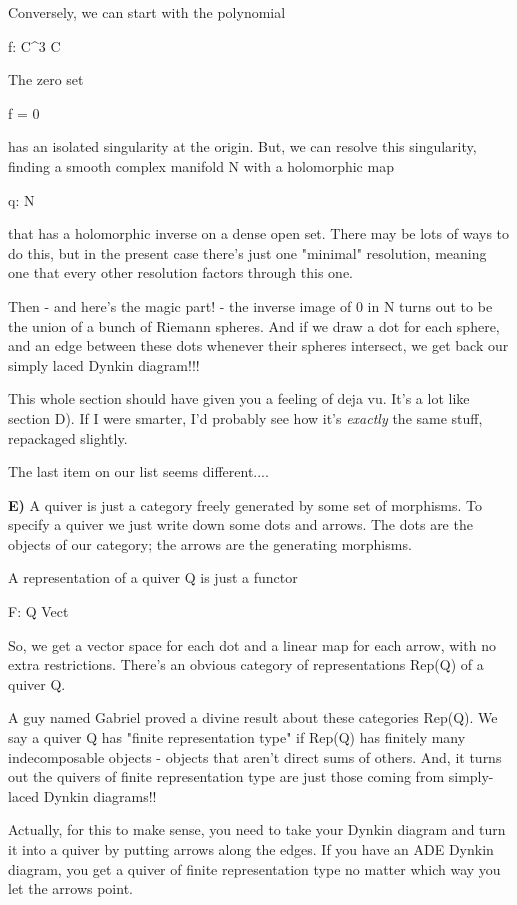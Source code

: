 Conversely, we can start with the polynomial

f: C^{3} \to  C

The zero set

{f = 0}

has an isolated singularity at the origin.  But, we can resolve
this singularity, finding a smooth complex manifold N with a 
holomorphic map

q: N 

that has a holomorphic inverse on a dense open set.  There may be 
lots of ways to do this, but in the present case there's just one 
"minimal" resolution, meaning one that every other resolution 
factors through this one.

Then - and here's the magic part! - the inverse image of 0 in N
turns out to be the union of a bunch of Riemann spheres.  And
if we draw a dot for each sphere, and an edge between these dots 
whenever their spheres intersect, we get back our simply laced
Dynkin diagram!!!

This whole section should have given you a feeling of deja vu.
It's a lot like section D).  If I were smarter, I'd probably see 
how it's \emph{exactly} the same stuff, repackaged slightly.  

The last item on our list seems different....

\textbf{E)} A quiver is just a category freely generated by some set of
morphisms.  To specify a quiver we just write down some dots
and arrows.  The dots are the objects of our category; the 
arrows are the generating morphisms.

A representation of a quiver Q is just a functor 

F: Q \to  Vect

So, we get a vector space for each dot and a linear map for
each arrow, with no extra restrictions.  There's an obvious
category of representations Rep(Q) of a quiver Q.

A guy named Gabriel proved a divine result about these categories
Rep(Q).  We say a quiver Q has "finite representation type"
if Rep(Q) has finitely many indecomposable objects - objects that
aren't direct sums of others.  And, it turns out the quivers of
finite representation type are just those coming from simply-laced
Dynkin diagrams!!

Actually, for this to make sense, you need to take your Dynkin diagram
and turn it into a quiver by putting arrows along the edges.  If you
have an ADE Dynkin diagram, you get a quiver of finite representation
type no matter which way you let the arrows point.

